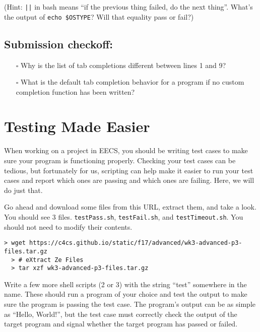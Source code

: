 \documentclass{article}
\begin{document}
\medskip
\noindent
(Hint: \texttt{||} in bash means ``if the previous thing failed, do the next
thing''. What's the output of \texttt{echo \$OSTYPE}? Will that equality pass
or fail?)


\subsection*{Submission checkoff:}
\begin{itemize}
  \item[$\square$] Why is the list of tab completions different between lines
    1 and 9?
  \item[$\square$] What is the default tab completion behavior for a program
    if no custom completion function has been written?
\end{itemize}


\pagebreak


\section{Testing Made Easier}

\medskip
\noindent
When working on a project in EECS, you should be writing test cases to make
sure your program is functioning properly. Checking your test cases can be
tedious, but fortunately for us, scripting can help make it easier to run your
test cases and report which ones are passing and which ones are failing. Here,
we will do just that.

\noindent
Go ahead and download some files from this URL, extract them, and take a look.
You should see 3 files. \texttt{testPass.sh}, \texttt{testFail.sh}, and
\texttt{testTimeout.sh}. You should not need to modify their contents.

\begin{Verbatim}[fontsize=\footnotesize]
  > wget https://c4cs.github.io/static/f17/advanced/wk3-advanced-p3-files.tar.gz
  > # eXtract Ze Files
  > tar xzf wk3-advanced-p3-files.tar.gz
\end{Verbatim}

\noindent
Write a few more shell scripts (2 or 3) with the string ``test'' somewhere in
the name. These should run a program of your choice and test the output to make
sure the program is passing the test case. The program's output can be as
simple as ``Hello, World!'', but the test case must correctly check the output
of the target program and signal whether the target program has passed or
failed.
\end{document}
